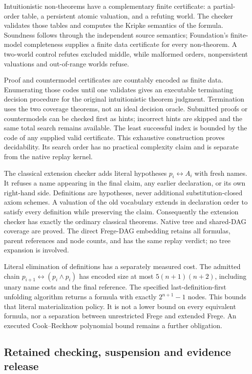 \documentclass[11pt,a4paper]{article}
\begin{document}
Intuitionistic non-theorems have a complementary finite certificate: a
partial-order table, a persistent atomic valuation, and a refuting world.
The checker validates those tables and computes the Kripke semantics of the
formula. Soundness follows through the independent source semantics;
Foundation's finite-model completeness supplies a finite data certificate
for every non-theorem. A two-world control refutes excluded middle, while
malformed orders, nonpersistent valuations and out-of-range worlds refuse.

Proof and countermodel certificates are countably encoded as finite data.
Enumerating those codes until one validates gives an executable terminating
decision procedure for the original intuitionistic theorem judgment.
Termination uses the two coverage theorems, not an ideal decision oracle.
Submitted proofs or countermodels can be checked first as hints; incorrect
hints are skipped and the same total search remains available. The least
successful index is bounded by the code of any supplied valid certificate.
This exhaustive construction proves decidability. Its search order has no
practical complexity claim and is separate from the native replay kernel.

The classical extension checker adds literal hypotheses
$p_i\leftrightarrow A_i$ with fresh names. It refuses a name appearing in
the final claim, any earlier declaration, or its own right-hand side.
Definitions are hypotheses, never additional substitution-closed axiom
schemes. A valuation of the old vocabulary extends in declaration order to
satisfy every definition while preserving the claim. Consequently the
extension checker has exactly the ordinary classical theorems. Native tree
and shared-DAG coverage are proved. The direct Frege-DAG embedding retains
all formulas, parent references and node counts, and has the same replay
verdict; no tree expansion is involved.

Literal elimination of definitions has a separately measured cost. The
admitted chain $p_{i+1}\leftrightarrow(p_i\wedge p_i)$ has encoded size at
most $5(n+1)(n+2)$, including unary name costs and the final reference.
The specified last-definition-first unfolding algorithm returns a formula
with exactly $2^{n+1}-1$ nodes. This bounds that literal materialization
policy. It is not a lower bound on every equivalent formula, nor a
separation between unrestricted Frege and extended Frege. An executed
Cook--Reckhow polynomial bound remains a further obligation.

\subsection{Retained checking, suspension and evidence release}
\end{document}
